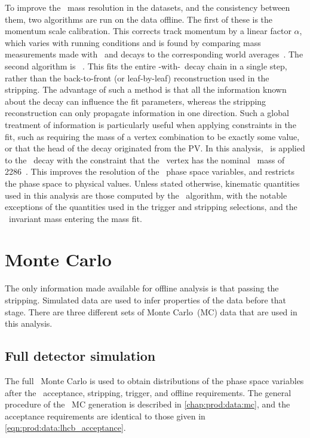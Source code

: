 To improve the \PLambdac\ mass resolution in the datasets, and the consistency 
between them, two algorithms are run on the data offline.
The first of these is the momentum scale calibration.
This corrects track momentum by a linear factor $\alpha$, which varies with 
running conditions and is found by comparing mass measurements made with 
\JpsiTomumu\ and \decay{\PBplus}{\PJpsi\PKplus} decays to the corresponding 
world averages~\cite{Aaij:2014jba}.
The second algorithm is \decaytreefitter~\cite{Hulsbergen:2005pu}.
This fits the entire \LbToLcmuX-with-\LcTophh\ decay chain in a single step, 
rather than the back-to-front (or leaf-by-leaf) reconstruction used in the 
stripping.
The advantage of such a method is that all the information known about the 
decay can influence the fit parameters, whereas the stripping reconstruction 
can only propagate information in one direction.
Such a global treatment of information is particularly useful when applying 
constraints in the fit, such as requiring the mass of a vertex combination to 
be exactly some value, or that the head of the decay originated from the 
\ac{PV}.
In this analysis, \decaytreefitter\ is applied to the \PLambdab\ decay with the 
constraint that the \phh\ vertex has the nominal \PLambdac\ mass of 
\SI{2286}{\MeVcc}~\cite{PDG2014}.
This improves the resolution of the \PLambdac\ phase space variables, and 
restricts the phase space to physical values.
Unless stated otherwise, kinematic quantities used in this analysis are those 
computed by the \decaytreefitter\ algorithm, with the notable exceptions of the 
quantities used in the trigger and stripping selections, and the \phh\ 
invariant mass entering the mass fit.

\section{Monte Carlo}
\label{chap:cpv:data:mc}

The only information made available for offline analysis is that passing the 
stripping.
Simulated data are used to infer properties of the data before that stage.
There are three different sets of Monte Carlo~(MC) data that are used in this 
analysis.

\subsection{Full detector simulation}
\label{chap:cpv:data:mc:full}

The full \lhcb\ Monte Carlo is used to obtain distributions of the phase space 
variables after the \lhcb\ acceptance, stripping, trigger, and offline 
requirements.
The general procedure of the \lhcb\ \ac{MC} generation is described in 
\cref{chap:prod:data:mc}, and the acceptance requirements are identical to 
those given in \cref{eqn:prod:data:lhcb_acceptance}.

